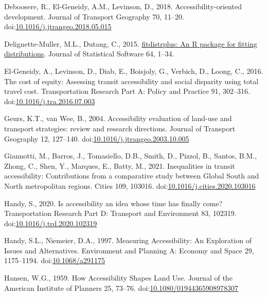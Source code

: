 \documentclass[]{elsarticle} %
\newlength{\cslhangindent}
\newlength{\cslentryspacingunit} %
\newenvironment{CSLReferences}[2] %
 {%
  \setlength{\parindent}{0pt}
  \ifodd #1
  \let\oldpar\par
  \def\par{\hangindent=\cslhangindent\oldpar}
  \fi
  \setlength{\parskip}{#2\cslentryspacingunit}
 }%
 {}
\begin{document}
\begin{CSLReferences}{1}{0}
\leavevmode{}%
Deboosere, R., El-Geneidy, A.M., Levinson, D., 2018.
Accessibility-oriented development. Journal of Transport Geography 70,
11--20.
doi:\href{https://doi.org/10.1016/j.jtrangeo.2018.05.015}{10.1016/j.jtrangeo.2018.05.015}

\leavevmode{}%
Delignette-Muller, M.L., Dutang, C., 2015.
\href{https://www.jstatsoft.org/article/view/v064i04}{{fitdistrplus}: An
{R} package for fitting distributions}. Journal of Statistical Software
64, 1--34.

\leavevmode{}%
El-Geneidy, A., Levinson, D., Diab, E., Boisjoly, G., Verbich, D.,
Loong, C., 2016. The cost of equity: {Assessing} transit accessibility
and social disparity using total travel cost. Transportation Research
Part A: Policy and Practice 91, 302--316.
doi:\href{https://doi.org/10.1016/j.tra.2016.07.003}{10.1016/j.tra.2016.07.003}

\leavevmode{}%
Geurs, K.T., van Wee, B., 2004. Accessibility evaluation of land-use and
transport strategies: review and research directions. Journal of
Transport Geography 12, 127--140.
doi:\href{https://doi.org/10.1016/j.jtrangeo.2003.10.005}{10.1016/j.jtrangeo.2003.10.005}

\leavevmode{}%
Giannotti, M., Barros, J., Tomasiello, D.B., Smith, D., Pizzol, B.,
Santos, B.M., Zhong, C., Shen, Y., Marques, E., Batty, M., 2021.
Inequalities in transit accessibility: {Contributions} from a
comparative study between {Global} {South} and {North} metropolitan
regions. Cities 109, 103016.
doi:\href{https://doi.org/10.1016/j.cities.2020.103016}{10.1016/j.cities.2020.103016}

\leavevmode{}%
Handy, S., 2020. Is accessibility an idea whose time has finally come?
Transportation Research Part D: Transport and Environment 83, 102319.
doi:\href{https://doi.org/10.1016/j.trd.2020.102319}{10.1016/j.trd.2020.102319}

\leavevmode{}%
Handy, S.L., Niemeier, D.A., 1997. Measuring {Accessibility}: {An}
{Exploration} of {Issues} and {Alternatives}. Environment and Planning
A: Economy and Space 29, 1175--1194.
doi:\href{https://doi.org/10.1068/a291175}{10.1068/a291175}

\leavevmode{}%
Hansen, W.G., 1959. How Accessibility Shapes Land Use. Journal of the
American Institute of Planners 25, 73--76.
doi:\href{https://doi.org/10.1080/01944365908978307}{10.1080/01944365908978307}


\end{CSLReferences}
\end{document}
